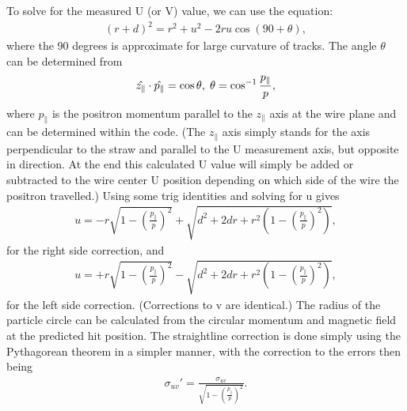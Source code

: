 To solve for the measured U (or V) value, we can use the equation:
\begin{align}
	(r+d)^{2} = r^{2}+u^{2}-2ru\cos(90+\theta),
\end{align}
where the 90 degrees is approximate for large curvature of tracks. The angle $\theta$ can be determined from 
\begin{align}
	\hat{z_{\parallel}} \cdot \hat{p_{\parallel}} = \cos{\theta}, \hspace{.1cm} \theta = \cos^{-1}{\frac{p_{\parallel}}{p}}, 
\end{align}
where $p_{\parallel}$ is the positron momentum parallel to the $z_{\parallel}$ axis at the wire plane and can be determined within the code. (The $z_{\parallel}$ axis simply stands for the axis perpendicular to the straw and parallel to the U measurement axis, but opposite in direction. At the end this calculated U value will simply be added or subtracted to the wire center U position depending on which side of the wire the positron travelled.) Using some trig identities and solving for u gives
\begin{align}
	u = -r\sqrt{1-(\frac{p_{\parallel}}{p})^{2}} + \sqrt{d^{2} + 2dr + r^{2}(1-(\frac{p_{\parallel}}{p})^{2})},
\end{align}
for the right side correction, and 
\begin{align}
	u = +r\sqrt{1-(\frac{p_{\parallel}}{p})^{2}} - \sqrt{d^{2} + 2dr + r^{2}(1-(\frac{p_{\parallel}}{p})^{2})},
\end{align}
for the left side correction. (Corrections to v are identical.) The radius of the particle circle can be calculated from the circular momentum and magnetic field at the predicted hit position. The straightline correction is done simply using the Pythagorean theorem in a simpler manner, with the correction to the errors then being
\begin{align}
	\sigma_{uv}' = \frac{\sigma_{uv}}{\sqrt{1-(\frac{p_{\parallel}}{p})^{2}}}.
\end{align}
